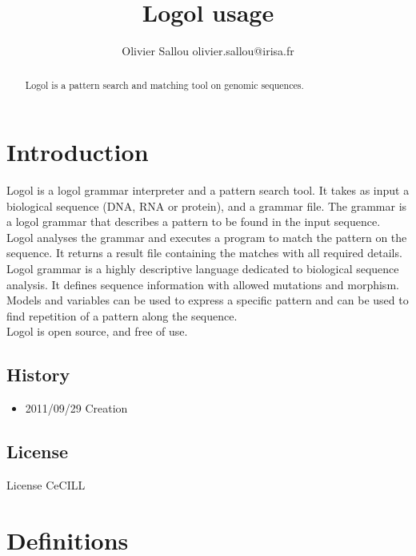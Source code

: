 \documentclass[11pt]{article}
\begin{document}
\title{%
    Logol usage}
\author{%
    Olivier Sallou
    olivier.sallou@irisa.fr}

\maketitle

\begin{abstract}
 Logol is a pattern search and matching tool on genomic sequences.
\end{abstract}

\tableofcontents

\section{Introduction}

\label{sec:logol}
Logol is a logol grammar interpreter and a pattern search tool. It takes as input a biological sequence (DNA, RNA or protein), and a grammar file. The grammar is a logol grammar that describes a pattern to be found in the input sequence. Logol analyses the grammar and executes a program to match the pattern on the sequence. It returns a result file containing the matches with all required details.\\
Logol grammar is a highly descriptive language dedicated to biological sequence analysis. It defines sequence information with allowed mutations and morphism. Models and variables can be used to express a specific pattern and can be used to find repetition of a pattern along the sequence.\\
Logol is open source, and free of use.

\subsection{History}

\begin{itemize}
    \item 2011/09/29 Creation
\end{itemize}

\subsection{License}

    License CeCILL

\section{Definitions}
\end{document}
